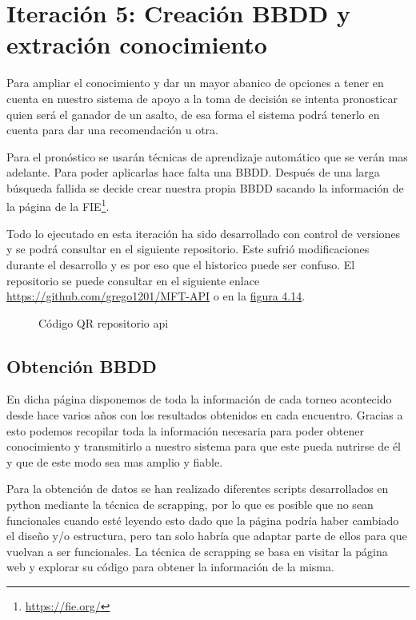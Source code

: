 \section{Iteración 5: Creación \acs{BBDD} y extración conocimiento}

Para ampliar el conocimiento y dar un mayor abanico de opciones
a tener en cuenta en nuestro sistema de apoyo a la toma de decisión
se intenta pronosticar quien será el ganador de un asalto, de esa forma
el sistema podrá tenerlo en cuenta para dar una recomendación u otra.


Para el pronóstico se usarán técnicas de aprendizaje automático que se
verán mas adelante. Para poder aplicarlas hace falta una \acs{BBDD}. Después de
una larga búsqueda fallida se decide crear nuestra propia \acs{BBDD} sacando
la información de la página de la \acl{FIE}\footnote{\url{https://fie.org/}}.

Todo lo ejecutado en esta iteración ha sido desarrollado con control de versiones
y se podrá consultar en el siguiente repositorio. Este sufrió modificaciones durante
el desarrollo y es por eso que el historico puede ser confuso. El repositorio se puede
consultar en el siguiente enlace \url{https://github.com/grego1201/MFT-API} o en la \hyperref[fig:Código QR repositorio api]{figura 4.14}.

\begin{figure}[htb]
  \centering
  \caption[Código QR repositorio api]{Código QR repositorio api}
  \label{fig:Código QR repositorio api}
\end{figure}

\subsection{Obtención \acs{BBDD}}

En dicha página disponemos de toda la información de cada torneo acontecido
desde hace varios años con los resultados obtenidos en cada encuentro. Gracias
a esto podemos recopilar toda la información necesaria para poder obtener conocimiento
y transmitirlo a nuestro sistema para que este pueda nutrirse de él y que de este
modo sea mas amplio y fiable.

Para la obtención de datos se han realizado diferentes scripts desarrollados en
python mediante la técnica de scrapping, por lo que es posible que no sean funcionales
cuando esté leyendo esto dado que la página podría haber cambiado el diseño y/o
estructura, pero tan solo habría que adaptar parte de ellos para que vuelvan a
ser funcionales. La técnica de scrapping se basa en visitar la página web y
explorar su código para obtener la información de la misma.

